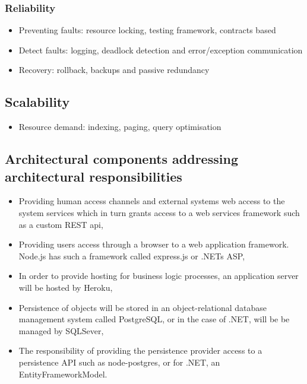\documentclass{article}
\begin{document}
		\subsubsection{Reliability}

		\begin{itemize}

			\item Preventing faults: resource locking, testing framework, contracts based
			\item Detect faults: logging, deadlock detection and error/exception communication
			\item Recovery: rollback, backups and passive redundancy

		\end{itemize}

		\subsection{Scalability}

		\begin{itemize}

			\item Resource demand: indexing, paging, query optimisation

		\end{itemize}

	\subsection{Architectural components addressing architectural responsibilities}

		\begin{itemize}

		\item Providing human access channels and external systems web access to the system services which in turn grants access to a web services framework such as a custom REST api,
		\item Providing users access through a browser to a web application framework. Node.js has such a framework called express.js or .NETs ASP,
		\item In order to provide hosting for business logic processes, an application server will be hosted by Heroku,
		\item Persistence of objects will be stored in an object-relational database management system called PostgreSQL, or in the case of .NET, will be be managed by SQLSever,
		\item The responsibility of providing the persistence provider access to a persistence API such as node-postgres, or for .NET, an EntityFrameworkModel.


		\end{itemize}
\end{document}
